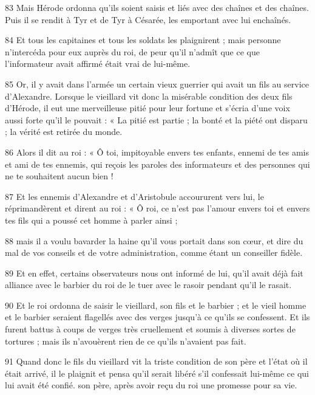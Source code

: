 \par 83 Mais Hérode ordonna qu'ils soient saisis et liés avec des chaînes et des chaînes. Puis il se rendit à Tyr et de Tyr à Césarée, les emportant avec lui enchaînés.

\par 84 Et tous les capitaines et tous les soldats les plaignirent ; mais personne n'intercéda pour eux auprès du roi, de peur qu'il n'admît que ce que l'informateur avait affirmé était vrai de lui-même.

\par 85 Or, il y avait dans l'armée un certain vieux guerrier qui avait un fils au service d'Alexandre. Lorsque le vieillard vit donc la misérable condition des deux fils d'Hérode, il eut une merveilleuse pitié pour leur fortune et s'écria d'une voix aussi forte qu'il le pouvait : « La pitié est partie ; la bonté et la piété ont disparu ; la vérité est retirée du monde.

\par 86 Alors il dit au roi : « Ô toi, impitoyable envers tes enfants, ennemi de tes amis et ami de tes ennemis, qui reçois les paroles des informateurs et des personnes qui ne te souhaitent aucun bien !

\par 87 Et les ennemis d'Alexandre et d'Aristobule accoururent vers lui, le réprimandèrent et dirent au roi : « Ô roi, ce n'est pas l'amour envers toi et envers tes fils qui a poussé cet homme à parler ainsi ;

\par 88 mais il a voulu bavarder la haine qu'il vous portait dans son cœur, et dire du mal de vos conseils et de votre administration, comme étant un conseiller fidèle.

\par 89 Et en effet, certains observateurs nous ont informé de lui, qu'il avait déjà fait alliance avec le barbier du roi de le tuer avec le rasoir pendant qu'il le rasait.

\par 90 Et le roi ordonna de saisir le vieillard, son fils et le barbier ; et le vieil homme et le barbier seraient flagellés avec des verges jusqu'à ce qu'ils se confessent. Et ils furent battus à coups de verges très cruellement et soumis à diverses sortes de tortures ; mais ils n'avouèrent rien de ce qu'ils n'avaient pas fait.

\par 91 Quand donc le fils du vieillard vit la triste condition de son père et l'état où il était arrivé, il le plaignit et pensa qu'il serait libéré s'il confessait lui-même ce qui lui avait été confié. son père, après avoir reçu du roi une promesse pour sa vie.

